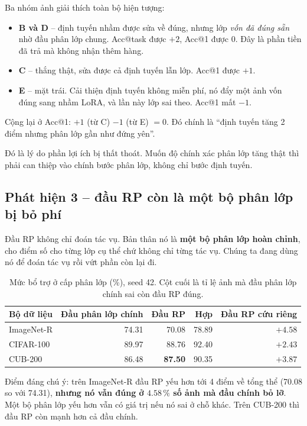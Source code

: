 \documentclass[11pt,a4paper]{article}
\begin{document}
Ba nhóm ảnh giải thích toàn bộ hiện tượng:

\begin{itemize}
\item \textbf{B và D} -- định tuyến nhầm được sửa về đúng, nhưng lớp \emph{vốn đã
      đúng sẵn} nhờ đầu phân lớp chung. Acc@task được $+2$, Acc@1 được $0$.
      Đây là phần tiền đã trả mà không nhận thêm hàng.
\item \textbf{C} -- thắng thật, sửa được cả định tuyến lẫn lớp. Acc@1 được $+1$.
\item \textbf{E} -- mặt trái. Cải thiện định tuyến không miễn phí, nó đẩy một ảnh
      vốn đúng sang nhầm LoRA, và lần này lớp sai theo. Acc@1 mất $-1$.
\end{itemize}

Cộng lại ở Acc@1: $+1$ (từ C) $-1$ (từ E) $= 0$. Đó chính là ``định tuyến tăng 2
điểm nhưng phân lớp gần như đứng yên''.

Đó là lý do phần lợi ích bị thất thoát. Muốn độ chính xác phân lớp tăng thật thì
phải can thiệp vào chính bước phân lớp, không chỉ bước định tuyến.

\subsection{Phát hiện 3 -- đầu RP còn là một bộ phân lớp bị bỏ phí}

Đầu RP không chỉ đoán tác vụ. Bản thân nó là \textbf{một bộ phân lớp hoàn chỉnh},
cho điểm số cho từng lớp cụ thể chứ không chỉ từng tác vụ. Chúng ta đang dùng nó
để đoán tác vụ rồi vứt phần còn lại đi.

\begin{table}[htbp]
\centering
\caption{Mức bổ trợ ở cấp phân lớp (\%), seed 42. Cột cuối là tỉ lệ ảnh mà đầu
phân lớp chính sai còn đầu RP đúng.}
\label{tab:cls}
\begin{tabular}{lrrrr}
\toprule
Bộ dữ liệu & Đầu phân lớp chính & Đầu RP & Hợp & Đầu RP cứu riêng \\
\midrule
ImageNet-R & 74.31 & 70.08 & 78.89 & $+4.58$ \\
CIFAR-100  & 89.97 & 88.76 & 92.40 & $+2.43$ \\
CUB-200    & 86.48 & \textbf{87.50} & 90.35 & $+3.87$ \\
\bottomrule
\end{tabular}
\end{table}

Điểm đáng chú ý: trên ImageNet-R đầu RP yếu hơn tới 4 điểm về tổng thể (70.08 so
với 74.31), \textbf{nhưng nó vẫn đúng ở $4.58\,\%$ số ảnh mà đầu chính bỏ lỡ}.
Một bộ phân lớp yếu hơn vẫn có giá trị nếu nó sai ở chỗ khác. Trên CUB-200 thì
đầu RP còn mạnh hơn cả đầu chính.
\end{document}
